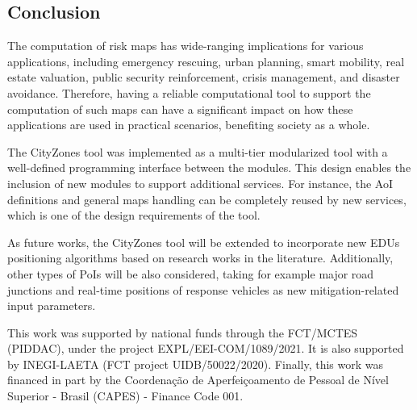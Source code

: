 \begin{refsection}
\section{Conclusion}

The computation of risk maps has wide-ranging implications for various applications, including emergency rescuing, urban planning, smart mobility, real estate valuation, public security reinforcement, crisis management, and disaster avoidance. Therefore, having a reliable computational tool to support the computation of such maps can have a significant impact on how these applications are used in practical scenarios, benefiting society as a whole. 

The CityZones tool was implemented as a multi-tier modularized tool with a well-defined programming interface between the modules. This design enables the inclusion of new modules to support additional services. For instance, the AoI definitions and general maps handling can be completely reused by new services, which is one of the design requirements of the tool.

As future works, the CityZones tool will be extended to incorporate new EDUs positioning algorithms based on research works in the literature. Additionally, other types of PoIs will be also considered, taking for example major road junctions and real-time positions of response vehicles as new mitigation-related input parameters.


This work was supported by national funds through the FCT/MCTES (PIDDAC), under the project EXPL/EEI-COM/1089/2021. It is also supported by INEGI-LAETA (FCT project UIDB/50022/2020). Finally, this work was financed in part by the Coordenação de Aperfeiçoamento de Pessoal de Nível Superior - Brasil (CAPES) - Finance Code 001.

\printbibliography[heading=subbibliography]

\end{refsection}
